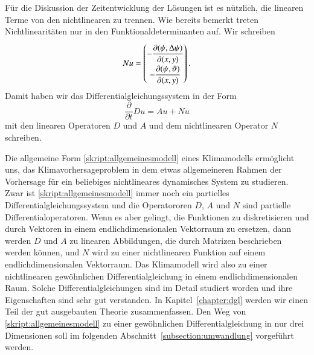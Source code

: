 Für die Diskussion der Zeitentwicklung der Lösungen ist es nützlich,
die linearen Terme von den nichtlinearen zu trennen.
Wie bereits bemerkt treten Nichtlinearitäten nur in den
Funktionaldeterminanten auf.
Wir schreiben
\[
Nu
=
\def\arraystretch{1.9}
\begin{pmatrix}
\displaystyle
-\frac{\partial(\psi,\Delta\psi)}{\partial(x,y)}\\
\displaystyle
-\frac{\partial(\psi,\vartheta)}{\partial(x,y)}
\end{pmatrix}.
\]
Damit haben wir das Differentialgleichungssystem in der Form
\begin{equation}
\frac{\partial}{\partial t}Du
=
Au+Nu
\label{skript:allgemeinesmodell}
\end{equation}
mit den linearen Operatoren $D$ und $A$ und dem nichtlinearen Operator
$N$ schreiben.

Die allgemeine Form \eqref{skript:allgemeinesmodell} eines Klimamodells
ermöglicht uns, das Klimavorhersageproblem in dem etwas allgemeineren
Rahmen der Vorhersage für ein beliebiges nichtlineares dynamisches
System zu studieren.
Zwar ist \eqref{skript:allgemeinesmodell} immer noch ein partielles
Differentialgleichungssystem und die Operatororen $D$, $A$ und $N$
sind partielle Differentialoperatoren.
Wenn es aber gelingt, die Funktionen zu diskretisieren und durch
Vektoren in einem endlichdimensionalen Vektorraum zu ersetzen, dann
werden $D$ und $A$ zu linearen Abbildungen, die durch Matrizen beschrieben
werden können, und $N$ wird zu einer nichtlinearen Funktion auf einem
endlichdimensionalen Vektorraum.
Das Klimamodell wird also zu einer nichtlinearen gewöhnlichen
Differentialgleichung in einem endlichdimensionalen Raum.
Solche Differentialgleichungen sind im Detail studiert worden und ihre
Eigenschaften sind sehr gut verstanden.
In Kapitel~\ref{chapter:dgl} werden wir einen Teil der gut ausgebauten
Theorie zusammenfassen.
Den Weg von \eqref{skript:allgemeinesmodell} zu einer gewöhnlichen
Differentialgleichung in nur drei Dimensionen soll im folgenden 
Abschnitt~\ref{subsection:umwandlung} vorgeführt werden.


